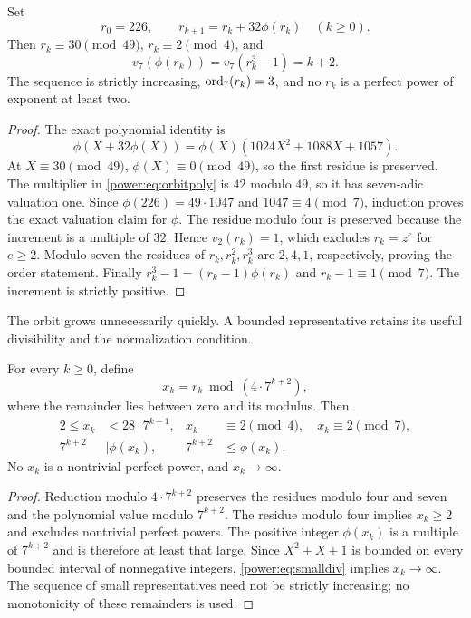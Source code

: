 \begin{lemma}\label{power:lem:orbit}
Set
\[
r_0=226,\qquad r_{k+1}=r_k+32\phi(r_k)\quad(k\ge0).
\]
Then $r_k\equiv30\pmod{49}$, $r_k\equiv2\pmod4$, and
\[
v_7(\phi(r_k))=v_7(r_k^3-1)=k+2.
\]
The sequence is strictly increasing, $\operatorname{ord}_7(r_k)=3$, and no $r_k$ is a
perfect power of exponent at least two.
\end{lemma}
\begin{proof}
The exact polynomial identity is
\begin{equation}\label{power:eq:orbitpoly}
\phi(X+32\phi(X))=\phi(X)(1024X^2+1088X+1057).
\end{equation}
At $X\equiv30\pmod{49}$, $\phi(X)\equiv0\pmod{49}$, so the first
residue is preserved. The multiplier in \eqref{power:eq:orbitpoly} is $42$ modulo
$49$, so it has seven-adic valuation one. Since
$\phi(226)=49\cdot1047$ and $1047\equiv4\pmod7$, induction proves the
exact valuation claim for $\phi$. The residue modulo four is preserved
because the increment is a multiple of $32$. Hence $v_2(r_k)=1$, which
excludes $r_k=z^e$ for $e\ge2$. Modulo seven the residues of $r_k,r_k^2,r_k^3$
are $2,4,1$, respectively, proving the order statement.
Finally $r_k^3-1=(r_k-1)\phi(r_k)$ and $r_k-1\equiv1\pmod7$.
The increment is strictly positive.
\end{proof}

The orbit grows unnecessarily quickly. A bounded representative retains
its useful divisibility and the normalization condition.
\begin{theorem}\label{power:thm:small}
For every $k\ge0$, define
\[
x_k=r_k\bmod(4\cdot7^{k+2}),
\]
where the remainder lies between zero and its modulus. Then
\begin{align}
2\le x_k&<28\cdot7^{k+1},&x_k&\equiv2\pmod4,\quad x_k\equiv2\pmod7,\label{power:eq:smallsize}\\
7^{k+2}&\mid\phi(x_k),& 7^{k+2}&\le\phi(x_k).\label{power:eq:smalldiv}
\end{align}
No $x_k$ is a nontrivial perfect power, and $x_k\to\infty$.
\end{theorem}
\begin{proof}
Reduction modulo $4\cdot7^{k+2}$ preserves the residues modulo four and
seven and the polynomial value modulo $7^{k+2}$. The residue modulo four
implies $x_k\ge2$ and excludes nontrivial perfect powers. The positive
integer $\phi(x_k)$ is a multiple of $7^{k+2}$ and is therefore at least
that large. Since $X^2+X+1$ is bounded on every bounded interval of
nonnegative integers, \eqref{power:eq:smalldiv} implies $x_k\to\infty$.
The sequence of small representatives need not be strictly increasing;
no monotonicity of these remainders is used.
\end{proof}

